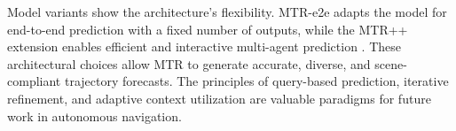 Model variants show the architecture's flexibility. MTR-e2e adapts the model for end-to-end prediction with a fixed number of outputs, while the MTR++ extension enables efficient and interactive multi-agent prediction \cite{Shi2023MTRplusplus}. These architectural choices allow MTR to generate accurate, diverse, and scene-compliant trajectory forecasts. The principles of query-based prediction, iterative refinement, and adaptive context utilization are valuable paradigms for future work in autonomous navigation.
